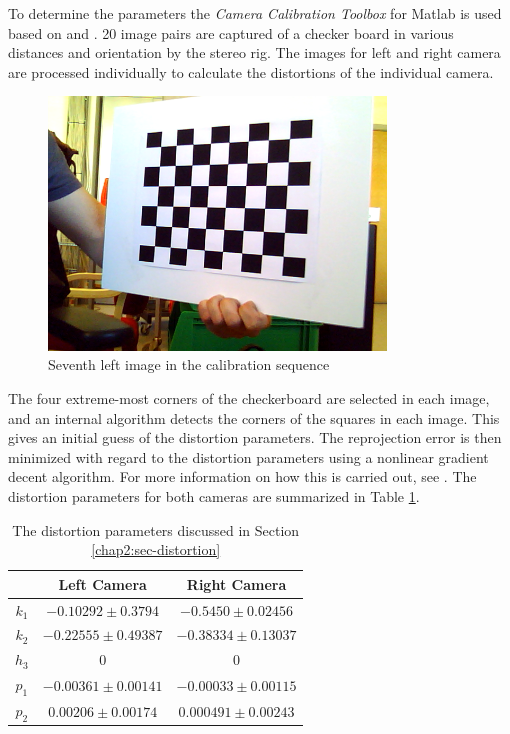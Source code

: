 To determine the parameters the \emph{Camera Calibration Toolbox} for Matlab is used
\cite{camera-calib-toolbox} based on \cite{heikkila} and \cite{mat-toolbox}.
20 image pairs are captured of a checker board in various
distances and orientation by the stereo rig. The images for left and right camera are
processed individually to calculate the distortions of the individual camera. 
\begin{figure}[htbp]
    \centering
    \includegraphics[width=0.8\textwidth]{pics/left7}
    \caption{Seventh left image in the calibration sequence}
    \label{chap2:fig-checkerboard}
\end{figure}
The four extreme-most corners of the checkerboard are selected in each image, and an
internal algorithm detects the corners of the squares in each image. This gives an initial
guess of the distortion parameters. The reprojection error is then minimized with
regard to the distortion parameters using a nonlinear gradient decent algorithm. For more
information on how this is carried out, see \cite{heikkila}.
The distortion parameters for both cameras are summarized in Table
\ref{chap3:tab-distortion-coeffs}.
\begin{table}[htbp]
  \centering
    \begin{tabular}{|c|c|c|} 
        \hline
                & Left Camera       & Right Camera \\
        \hline
        $k_1$   & $-0.10292 \pm 0.3794$            & $-0.5450 \pm 0.02456$  \\
        $k_2$   & $-0.22555 \pm 0.49387$            & $-0.38334 \pm 0.13037$  \\
        $h_3$   & $ 0$                          & $0$                  \\
        \hline
        $p_1$   & $-0.00361 \pm 0.00141$    & $-0.00033 \pm 0.00115$ \\
        $p_2$   & $0.00206 \pm 0.00174$     & $ 0.000491 \pm 0.00243$  \\
        \hline
    \end{tabular}
    \caption{The distortion parameters discussed in Section \ref{chap2:sec-distortion}}
    \label{chap3:tab-distortion-coeffs}
\end{table}

